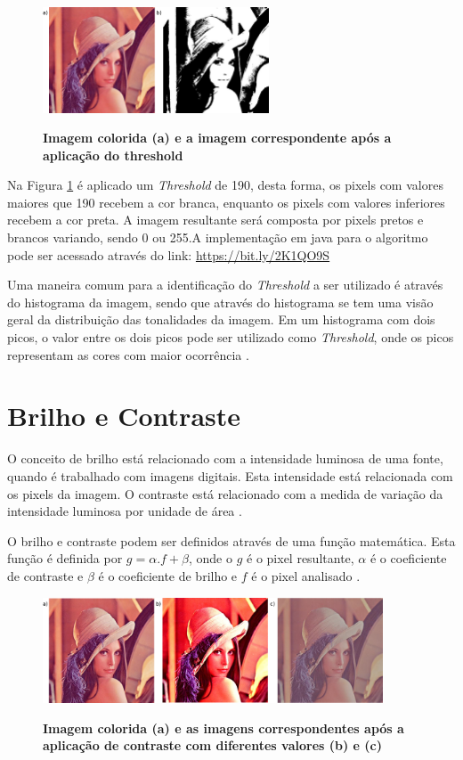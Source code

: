 \documentclass[
	12pt,				%
	oneside,			%
	a4paper,			%
	english,			%
	french,				%
	spanish,			%
	brazil,				%
	]{abntex2}
\begin{document}
\begin{figure}[ht]
\centering

\caption{\textbf{Imagem colorida (a) e a imagem correspondente após a aplicação do threshold}}
\includegraphics[width=0.6\textwidth]{imagens/limiarizacao.png}
\sourceAuthor
\label{fig:limiarizacaofig}
\end{figure}

Na Figura \ref{fig:limiarizacaofig} é aplicado um \textit{Threshold} de 190, desta forma, os pixels com valores maiores que 190 recebem a cor branca, enquanto os pixels com valores inferiores recebem a cor preta. A imagem resultante será composta por pixels pretos e brancos variando, sendo 0 ou 255.A implementação em java para o algoritmo pode ser acessado através do link: \url{https://bit.ly/2K1QO9S}

Uma maneira comum para a identificação do \textit{Threshold} a ser utilizado é através do histograma da imagem, sendo que através do histograma se tem uma visão geral da distribuição das tonalidades da imagem. Em um histograma com dois picos, o valor entre os dois picos pode ser utilizado como \textit{Threshold}, onde os picos representam as cores com maior ocorrência \cite{gonzalesWoods:2008}. 

\section{Brilho e Contraste}
O conceito de brilho está relacionado com a intensidade luminosa de uma fonte, quando é trabalhado com imagens digitais. Esta intensidade está relacionada com os pixels da imagem. O contraste está relacionado com a medida de variação da intensidade luminosa por unidade de área \cite{gonzalesWoods:2008}.

O brilho e contraste podem ser definidos através de uma função matemática. Esta função é definida por \(g = \alpha.f + \beta\), onde o \(g\) é o pixel resultante, \(\alpha\) é o coeficiente de contraste e \(\beta\) é o coeficiente de brilho e \(f\) é o pixel analisado \cite{pedriniSchwartz:2008}.

\begin{figure}[ht]
\centering
\caption{\textbf{Imagem colorida (a) e as imagens correspondentes após a aplicação de contraste com diferentes valores (b) e (c)}}
\includegraphics[width=0.9\textwidth]{imagens/contraste.png}
\sourceAuthor
\label{fig:contraste}
\end{figure}
\end{document}
